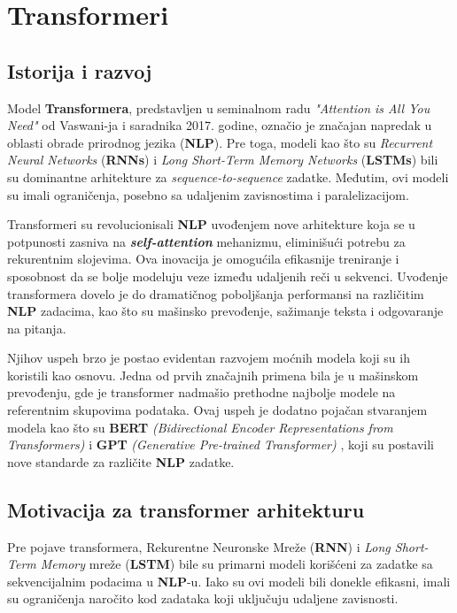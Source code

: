 \documentclass[12pt]{article}
\begin{document}
   \newpage
   \section{Transformeri}
   \subsection{Istorija i razvoj}
   Model \textbf{Transformera}, predstavljen u seminalnom radu \textit{"Attention is All You Need"} \cite{attentionneed} od Vaswani-ja i saradnika 2017. godine, 
   označio je značajan napredak u oblasti obrade prirodnog jezika (\textbf{NLP}). 
   Pre toga, modeli kao što su \textit{Recurrent Neural Networks} (\textbf{RNNs}) \cite{rnn} i 
   \textit{Long Short-Term Memory Networks} (\textbf{LSTMs}) \cite{lstm} bili su dominantne arhitekture za 
   \textit{sequence-to-sequence} zadatke. Međutim, ovi modeli su imali ograničenja, 
   posebno sa udaljenim zavisnostima i paralelizacijom.

   Transformeri su revolucionisali \textbf{NLP} uvođenjem nove arhitekture koja se u potpunosti zasniva na 
   \textbf{\textit{self-attention}} mehanizmu, eliminišući potrebu za rekurentnim slojevima. 
   Ova inovacija je omogućila efikasnije treniranje i sposobnost da se bolje modeluju veze između 
   udaljenih reči u sekvenci. Uvođenje transformera dovelo je do dramatičnog poboljšanja performansi 
   na različitim \textbf{NLP} zadacima, kao što su mašinsko prevođenje, sažimanje teksta i odgovaranje na pitanja.

   Njihov uspeh brzo je postao evidentan razvojem moćnih modela koji su ih koristili kao osnovu. 
   Jedna od prvih značajnih primena bila je u mašinskom prevođenju, gde je transformer 
   nadmašio prethodne najbolje modele na referentnim skupovima podataka. 
   Ovaj uspeh je dodatno pojačan stvaranjem modela kao što su \textbf{BERT} 
   \textit{(Bidirectional Encoder Representations from Transformers)} \cite{bert} i \textbf{GPT} 
   \textit{(Generative Pre-trained Transformer)} \cite{gpt2}, koji su postavili nove standarde za 
   različite \textbf{NLP} zadatke.

   \subsection{Motivacija za transformer arhitekturu}

   Pre pojave transformera, Rekurentne Neuronske Mreže (\textbf{RNN}) i 
   \textit{Long Short-Term Memory} mreže (\textbf{LSTM}) bile su primarni 
   modeli korišćeni za zadatke sa sekvencijalnim podacima u \textbf{NLP}-u. 
   Iako su ovi modeli bili donekle efikasni, imali su ograničenja naročito kod zadataka koji uključuju udaljene zavisnosti.
\end{document}
